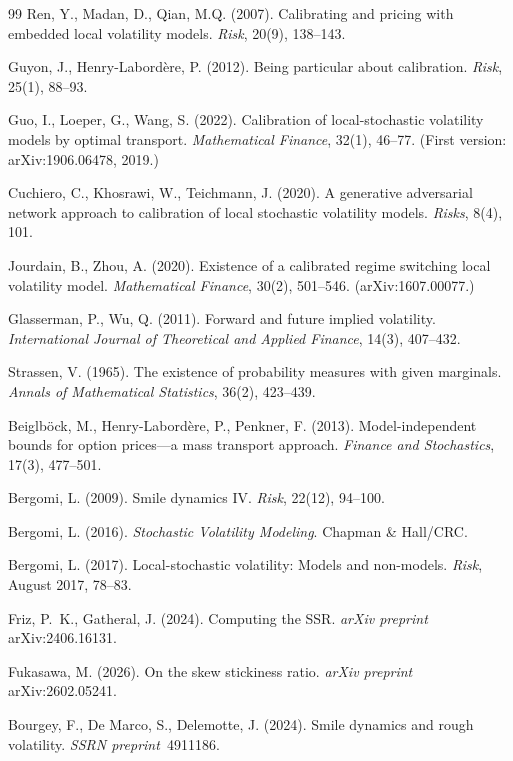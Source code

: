 \documentclass[11pt]{article}
\begin{document}
\begin{thebibliography}{99}
Ren, Y., Madan, D., Qian, M.Q. (2007).
Calibrating and pricing with embedded local volatility models.
\textit{Risk}, 20(9), 138--143.

Guyon, J., Henry-Labord\`ere, P. (2012).
Being particular about calibration. \textit{Risk}, 25(1), 88--93.

Guo, I., Loeper, G., Wang, S. (2022).
Calibration of local-stochastic volatility models by optimal transport.
\textit{Mathematical Finance}, 32(1), 46--77. (First version: arXiv:1906.06478, 2019.)

Cuchiero, C., Khosrawi, W., Teichmann, J. (2020).
A generative adversarial network approach to calibration of local stochastic
volatility models. \textit{Risks}, 8(4), 101.

Jourdain, B., Zhou, A. (2020).
Existence of a calibrated regime switching local volatility model.
\textit{Mathematical Finance}, 30(2), 501--546. (arXiv:1607.00077.)

Glasserman, P., Wu, Q. (2011).
Forward and future implied volatility.
\textit{International Journal of Theoretical and Applied Finance}, 14(3), 407--432.

Strassen, V. (1965).
The existence of probability measures with given marginals.
\textit{Annals of Mathematical Statistics}, 36(2), 423--439.

Beiglb\"ock, M., Henry-Labord\`ere, P., Penkner, F. (2013).
Model-independent bounds for option prices---a mass transport approach.
\textit{Finance and Stochastics}, 17(3), 477--501.

Bergomi, L. (2009). Smile dynamics IV. \textit{Risk}, 22(12), 94--100.

Bergomi, L. (2016). \textit{Stochastic Volatility Modeling}. Chapman \& Hall/CRC.

Bergomi, L. (2017). Local-stochastic volatility: Models and non-models.
\textit{Risk}, August 2017, 78--83.

Friz, P.~K., Gatheral, J. (2024). Computing the SSR. \textit{arXiv preprint} arXiv:2406.16131.

Fukasawa, M. (2026). On the skew stickiness ratio. \textit{arXiv preprint} arXiv:2602.05241.

Bourgey, F., De Marco, S., Delemotte, J. (2024). Smile dynamics and rough volatility.
\textit{SSRN preprint}~4911186.


\end{thebibliography}
\end{document}
